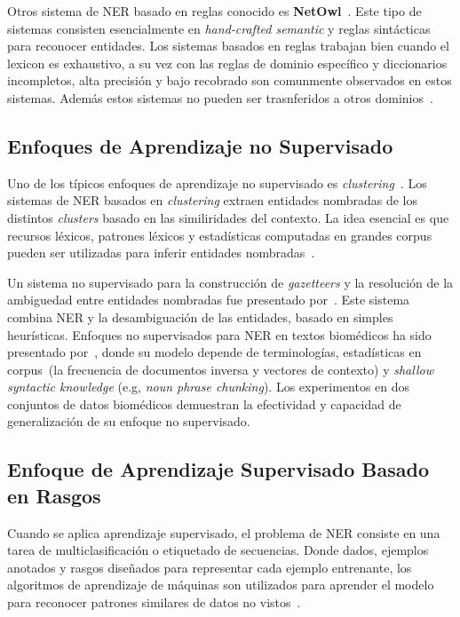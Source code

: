 Otros sistema de NER basado en reglas conocido es \textbf{NetOwl}~\cite{krupka2005description}. Este tipo de sistemas consisten esencialmente en \emph{hand-crafted semantic} y reglas sint\'acticas para reconocer entidades. Los sistemas basados en reglas trabajan bien cuando el lexicon es exhaustivo, a su vez con las reglas de dominio espec\'ifico y diccionarios incompletos, alta precisi\'on y bajo recobrado son comunmente observados en estos sistemas. Adem\'as estos sistemas no pueden ser trasnferidos a otros dominios~\cite{li2018survey}.


\subsection{Enfoques de Aprendizaje no Supervisado}  

Uno de los t\'ipicos enfoques de aprendizaje no supervisado es \emph{clustering}~\cite{nadeau2007survey}. Los sistemas de NER basados en \emph{clustering} extraen entidades nombradas de los distintos \emph{clusters} basado en las similiridades del contexto. La idea esencial es que recursos l\'exicos, patrones l\'exicos y estad\'isticas computadas en grandes corpus pueden ser utilizadas para inferir entidades nombradas~\cite{li2018survey}.

Un sistema no supervisado para la construcci\'on de \emph{gazetteers} y la resoluci\'on de la ambiguedad entre entidades nombradas fue presentado por~\cite{nadeau2006unsupervised}. Este sistema combina NER y la 
desambiguación de las entidades, basado en simples heur\'isticas. Enfoques no supervisados para NER en textos biom\'edicos ha sido presentado por~\cite{zhang2013unsupervised}, donde su modelo depende de terminolog\'ias, estad\'isticas en corpus~(la frecuencia de documentos inversa y vectores de contexto) y \emph{shallow syntactic knowledge} (e.g, \emph{noun phrase chunking}). Los experimentos en dos conjuntos de datos biom\'edicos demuestran la efectividad y capacidad de generalizaci\'on de su enfoque no supervisado.


\subsection{Enfoque de Aprendizaje Supervisado Basado en Rasgos}

Cuando se aplica aprendizaje supervisado, el problema de NER consiste en una tarea de multiclasificaci\'on o etiquetado de secuencias. Donde dados, ejemplos anotados y rasgos dise\~nados para representar cada ejemplo entrenante, los algoritmos de aprendizaje de m\'aquinas son utilizados para aprender el modelo para reconocer patrones similares de datos no vistos~\cite{li2018survey}.


